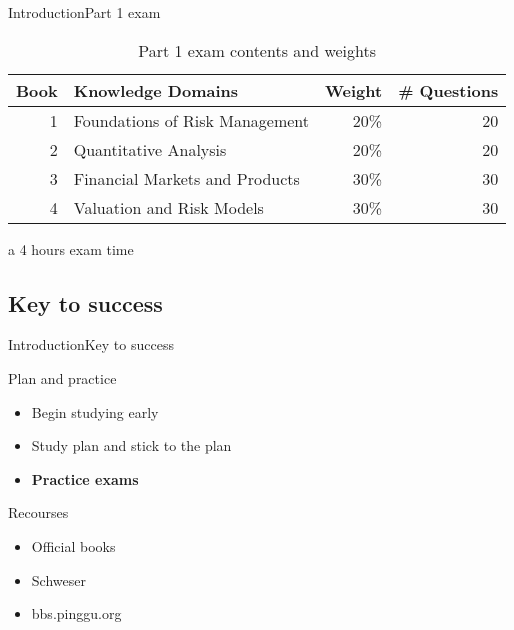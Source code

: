 \begin{frame}{Introduction}{Part 1 exam}
\begin{table}
\centering
\caption{Part 1 exam contents and weights}
\begin{threeparttable}[htbp]
	\begin{tabular}{||r|l|r|r||}
		\hline
		\hline
		\multicolumn{1}{||l|}{Book} & Knowledge Domains & \multicolumn{1}{l|}{Weight} & \multicolumn{1}{l||}{\# Questions} \bigstrut\\
		\hline
		1     & Foundations of Risk Management & 20\%  & 20 \bigstrut\\
		\hline
		2     & Quantitative Analysis & 20\%  & 20 \bigstrut\\
		\hline
		3     & Financial Markets and Products & 30\%  & 30 \bigstrut\\
		\hline
		4     & Valuation and Risk Models & 30\%  & 30 \bigstrut\\
		\hline
		\hline
	\end{tabular}
	\begin{tablenotes}
		\item [a] 4 hours exam time 
	\end{tablenotes}
\end{threeparttable}
\label{tab:weights}
\end{table}
\end{frame}

\subsection{Key to success}
\begin{frame}{Introduction}{Key to success}
\begin{block}{Plan and practice}
	\begin{itemize}
		\item Begin studying early
		\item Study plan and stick to the plan
		\item \textbf{Practice exams}
	\end{itemize}
\end{block}

\begin{block}{Recourses}
	\begin{itemize}
		\item Official books
		\item Schweser 
		\item bbs.pinggu.org
	\end{itemize}
\end{block}
\end{frame}

